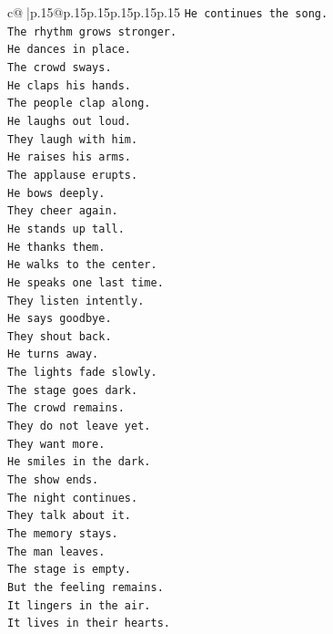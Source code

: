 \documentclass{article}
\begin{document}
{\begin{supertabular}{c@{$\;$}|p{.15\linewidth}@{}p{.15\linewidth}p{.15\linewidth}p{.15\linewidth}p{.15\linewidth}p{.15\linewidth}}
{{{\texttt{He continues the song.  } \\
\texttt{The rhythm grows stronger.  } \\
\texttt{He dances in place.  } \\
\texttt{The crowd sways.  } \\
\texttt{He claps his hands.  } \\
\texttt{The people clap along.  } \\
\texttt{He laughs out loud.  } \\
\texttt{They laugh with him.  } \\
\texttt{He raises his arms.  } \\
\texttt{The applause erupts.  } \\
\texttt{He bows deeply.  } \\
\texttt{They cheer again.  } \\
\texttt{He stands up tall.  } \\
\texttt{He thanks them.  } \\
\texttt{He walks to the center.  } \\
\texttt{He speaks one last time.  } \\
\texttt{They listen intently.  } \\
\texttt{He says goodbye.  } \\
\texttt{They shout back.  } \\
\texttt{He turns away.  } \\
\texttt{The lights fade slowly.  } \\
\texttt{The stage goes dark.  } \\
\texttt{The crowd remains.  } \\
\texttt{They do not leave yet.  } \\
\texttt{They want more.  } \\
\texttt{He smiles in the dark.  } \\
\texttt{The show ends.  } \\
\texttt{The night continues.  } \\
\texttt{They talk about it.  } \\
\texttt{The memory stays.  } \\
\texttt{The man leaves.  } \\
\texttt{The stage is empty.  } \\
\texttt{But the feeling remains.  } \\
\texttt{It lingers in the air.  } \\
\texttt{It lives in their hearts.  } \\
}}}
\end{supertabular}}
\end{document}
